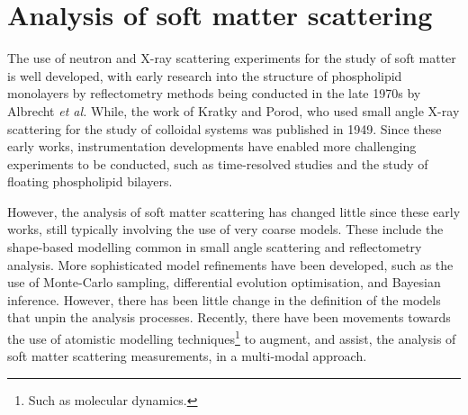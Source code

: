 \section{Analysis of soft matter scattering}
The use of neutron and X-ray scattering experiments for the study of soft matter is well developed, with early research into the structure of phospholipid monolayers by reflectometry methods being conducted in the late 1970s by Albrecht \emph{et al.}\autocite{albrecht_polymorphism_1978}
While, the work of Kratky and Porod,\autocite{kratky_diffuse_1949} who used small angle X-ray scattering for the study of colloidal systems was published in 1949.
Since these early works, instrumentation developments have enabled more challenging experiments to be conducted, such as time-resolved studies \autocite{jensen_monitoring_2014} and the study of floating phospholipid bilayers.\autocite{rondelli_reflectivity_2012}

However, the analysis of soft matter scattering has changed little since these early works, still typically involving the use of very coarse models.
These include the shape-based modelling common in small angle scattering \autocite[][see Section~\ref{sec:sasanal}]{hassan_small_2003} and reflectometry analysis.\autocite[][see Section~\ref{sec:sasanal}]{campbell_structure_2018,lu_analysis_1996}
More sophisticated model refinements have been developed, such as the use of Monte-Carlo sampling,\autocite{pedersen_monte_2002} differential evolution optimisation,\autocite{wormington_characterization_1999} and Bayesian inference.\autocite{nelson_refnx_2019}
However, there has been little change in the definition of the models that unpin the analysis processes.
Recently, there have been movements towards the use of atomistic modelling techniques\footnote{Such as molecular dynamics.} to augment, and assist, the analysis of soft matter scattering measurements, in a multi-modal approach.\autocite{scoppola_combining_2018}

